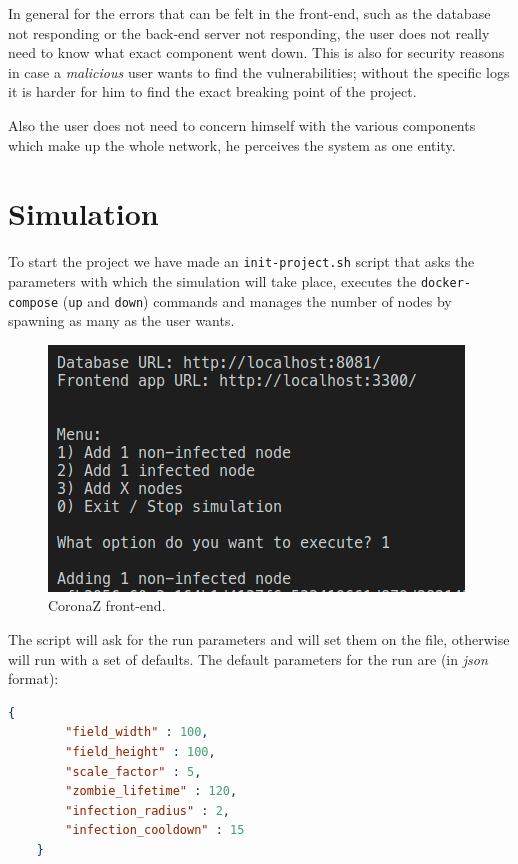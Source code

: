\documentclass[conference]{IEEEtran}
\begin{document}
	In general for the errors that can be felt in the front-end, such as the database not responding or the back-end server not responding, the user does not really need to know what exact component went down.
	This is also for security reasons in case a \textit{malicious} user wants to find the vulnerabilities; without the specific logs it is harder for him to find the exact breaking point of the project.
	
	Also the user does not need to concern himself with the various components which make up the whole network, he perceives the system as one entity.
	
\section{Simulation}\label{sec:simulation}

	To start the project we have made an \texttt{init-project.sh} script that asks the parameters with which the simulation will take place, executes the \texttt{docker-compose} (\texttt{up} and \texttt{down}) commands and manages the number of nodes by spawning as many as the user wants.
	
	\begin{figure}[htbp]
		\centerline{\includegraphics[width=\linewidth]{img/script.png}}
		\caption{CoronaZ front-end.}
		\label{fig:frontend}
	\end{figure}

	The script will ask for the run parameters and will set them on the file, otherwise will run with a set of defaults.
	The default parameters for the run are (in \textit{json} format):
	\begin{lstlisting}[language=json]
    {
        "field_width" : 100,
        "field_height" : 100,
        "scale_factor" : 5,
        "zombie_lifetime" : 120,
        "infection_radius" : 2,
        "infection_cooldown" : 15
    }
	\end{lstlisting}
	
\end{document}
